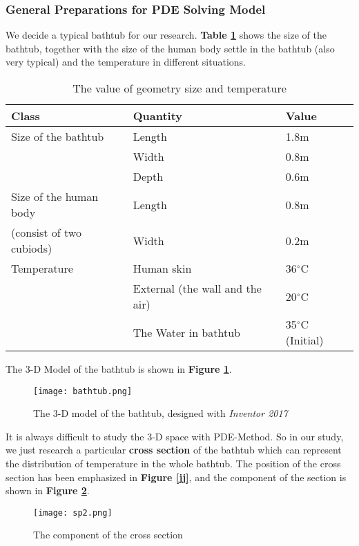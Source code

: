 \documentclass[12pt]{article}
\begin{document}
\subsubsection{General Preparations for PDE Solving Model}
We decide a typical bathtub for our research. \textbf{Table \ref{tb1}} shows the size of the
bathtub, together with the size of the human body settle in the bathtub (also very typical) and the
temperature in different situations.
\begin{table}[!htbp]
\begin{center}
\caption{The value of geometry size and temperature}
\begin{tabular}{lll}
    \toprule
    Class&Quantity&Value\\
    \midrule
    Size of the bathtub&Length&1.8m\\
    &Width&0.8m\\
    &Depth&0.6m\\
    \midrule
    Size of the human body&Length&0.8m\\
    (consist of two cubiods)&Width&0.2m\\
    \midrule
    Temperature&Human skin&36$^\circ$C\\
    &External (the wall and the air)&20$^\circ$C\\
    &The Water in bathtub&35$^\circ$C (Initial)\\
    \bottomrule
\end{tabular}\label{tb1}
\end{center}
\end{table}

The 3-D Model of the bathtub is shown in \textbf{Figure \ref{md}}.
\begin{figure}[!htbp]
\small
\centering
\texttt{[image: bathtub.png]}
\caption{The 3-D model of the bathtub, designed with \emph{Inventor 2017}}\label{md}
\end{figure}

It is always difficult to study the 3-D space with PDE-Method. So in our study, we just research a
particular \textbf{cross section} of the bathtub which can represent the distribution of temperature
in the whole bathtub. The position of the cross section has been emphasized in \textbf{Figure
\ref{jj}}, and the component of the section is shown in \textbf{Figure \ref{cs}}.
\begin{figure}[!htbp]
    \small
    \centering
    \texttt{[image: sp2.png]}
    \caption{The component of the cross section}\label{cs}
\end{figure}
\end{document}
